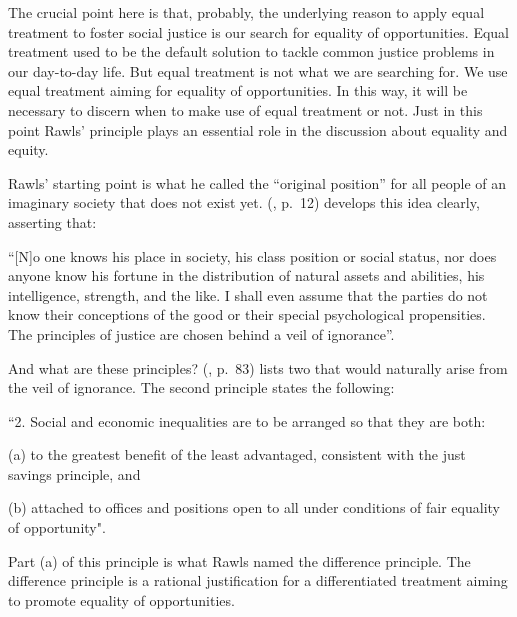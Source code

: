 The crucial point here is that, probably, the underlying reason to apply equal treatment to foster social justice is our search for equality of opportunities. Equal treatment used to be the default solution to tackle common justice problems in our day-to-day life. But equal treatment is not what we are searching for. We use equal treatment aiming for equality of opportunities. In this way, it will be necessary to discern when to make use of equal treatment or not. Just in this point Rawls' principle plays an essential role in the discussion about equality and equity.

Rawls' starting point is what he called the “original position” for all people of an imaginary society that does not exist yet.  (\citeyear{rawls:1971}, p.~12) develops this idea clearly, asserting that:
\begin{citacao}
    “[N]o one knows his place in society, his class position or social status, nor does anyone know his fortune in the distribution of natural assets and abilities, his intelligence, strength, and the like. I shall even assume that the parties do not know their conceptions of the good or their special psychological propensities. The principles of justice are chosen behind a veil of ignorance”.    
\end{citacao}

And what are these principles?  (\citeyear{rawls:1971}, p.~83) lists two that would naturally arise from the veil of ignorance. The second principle states the following:
\begin{citacao}
    “2. Social and economic inequalities are to be arranged so that they are both:
    
    \hspace{0.5cm} (a) to the greatest benefit of the least advantaged, consistent with the just savings principle, and
    
    \hspace{0.5cm} (b) attached to offices and positions open to all under conditions of fair equality of opportunity".
\end{citacao}
 
Part (a) of this principle is what Rawls named the difference principle. The difference principle is a rational justification for a differentiated treatment aiming to promote equality of opportunities.

